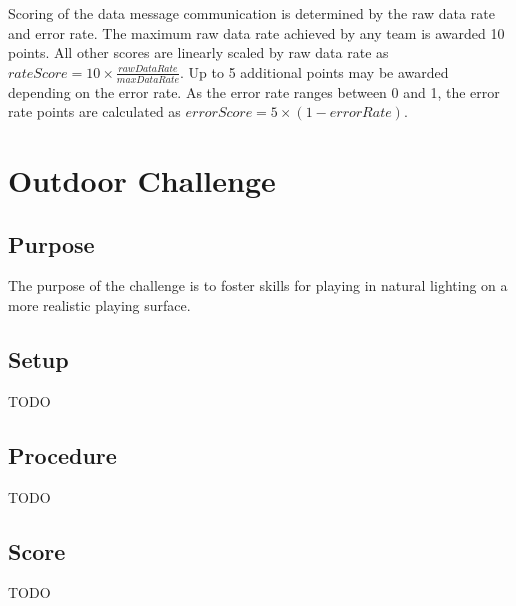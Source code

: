 \documentclass[12pt]{article}
\begin{document}
Scoring of the data message communication is determined by the raw data rate and error rate. The maximum raw data rate achieved by any team is awarded 10 points. All other scores are linearly scaled by raw data rate as $rateScore = 10 \times \frac{rawDataRate}{maxDataRate}$. Up to 5 additional points may be awarded depending on the error rate. As the error rate ranges between 0 and 1, the error rate points are calculated as $errorScore = 5\times (1 - errorRate)$. 

\newpage



\section{Outdoor Challenge}

\subsection{Purpose}

The purpose of the challenge is to foster skills for playing in natural lighting on a more realistic playing surface.

\subsection{Setup}
TODO

\subsection{Procedure}
TODO 

\subsection{Score}
TODO
\end{document}
